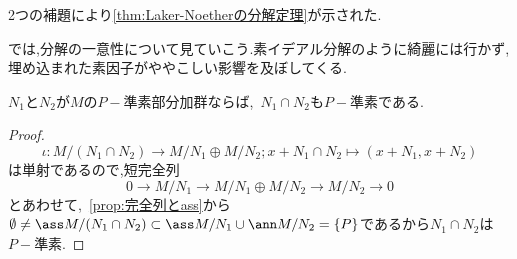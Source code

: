 2つの補題により\ref{thm:Laker-Noetherの分解定理}が示された.

では,分解の一意性について見ていこう.素イデアル分解のように綺麗には行かず,埋め込まれた素因子がややこしい影響を及ぼしてくる.
\begin{lem}
	$N_1$と$N_2$が$M$の$ P-$準素部分加群ならば,~$N_1\cap N_2$も$ P-$準素である.
\end{lem}
\begin{proof}
	\[\iota:M/(N_1\cap N_2)\longrightarrow M/N_1\oplus M/N_2;x+N_1\cap N_2\longmapsto(x+N_1,x+N_2)\]
	は単射であるので,短完全列
	\[0\longrightarrow M/N_1\longrightarrow M/N_1\oplus M/N_2\longrightarrow M/N_2\longrightarrow0\]
	とあわせて,~\ref{prop:完全列とass}から$\emptyset\neq\ass M/(N_1\cap N_2)\subset\ass M/N_1\cup\ann M/N_2=\{ P\}$であるから$N_1\cap N_2$は$ P-$準素.
\end{proof}

